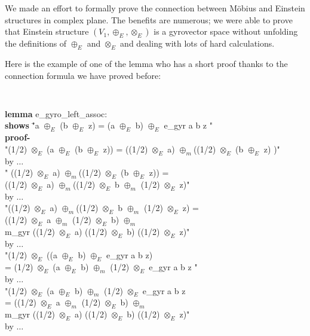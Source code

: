 \documentclass[a4paper]{article}
\newcommand{\tab}{\hspace{5mm}}
\theoremstyle{definition}
\begin{document}
We made an effort to formally prove the connection between M\" obius and Einstein structures in complex plane. The benefits are numerous; we were able to prove that Einstein structure $(V_1,\oplus_E, \otimes_E)$ is a gyrovector space without unfolding the definitions of $\oplus_E$ and $\otimes_E$ and dealing with lots of hard calculations.


Here is the example of one of the lemma who has a short proof thanks to the connection formula we have proved before:

{\tt
\begin{footnotesize}
\begin{tabbing}
{\bf lemma} e\_gyro\_left\_assoc:\\
{\bf shows} \="a $\oplus_E$ (b $\oplus_E$ z) = (a $\oplus_E$ b) $\oplus_E$ e\_gyr a b z "\\
{\bf proof-}\\
\tab {\bf have} "(1/2) $\otimes_E$ (a $\oplus_E$ (b $\oplus_E$ z)) = ((1/2) $\otimes_E$ a) $\oplus_m$((1/2) $\otimes_E$ (b $\oplus_E$ z) )" 
\\ \tab \tab by $\ldots$\\

\tab {\bf moreover have} " ((1/2) $\otimes_E$ a) $\oplus_m$((1/2) $\otimes_E$ (b $\oplus_E$ z)) = \\ \tab \tab ((1/2) $\otimes_E$ a) $\oplus_m$((1/2) $\otimes_E$ b $\oplus_m$ (1/2) $\otimes_E$ z)" 
\\ \tab \tab by $\ldots$\\

\tab {\bf moreover have} "((1/2) $\otimes_E$ a) $\oplus_m$((1/2) $\otimes_E$ b $\oplus_m$ (1/2) $\otimes_E$ z) = \\ \tab \tab ((1/2) $\otimes_E$ a $\oplus_m$ (1/2) $\otimes_E$ b) $\oplus_m$ \\ \tab \tab m\_gyr ((1/2) $\otimes_E$ a) ((1/2) $\otimes_E$ b) ((1/2) $\otimes_E$ z)" 
\\ \tab \tab by $\ldots$\\


\tab {\bf moreover have} "(1/2) $\otimes_E$ ((a $\oplus_E$ b) $\oplus_E$ e\_gyr a b z) \\ \tab \tab = (1/2)  $\otimes_E$ (a $\oplus_E$ b) $\oplus_m$ (1/2)  $\otimes_E$ e\_gyr a b z " 
\\ \tab \tab by $\ldots$\\

\tab {\bf moreover have} "(1/2)  $\otimes_E$ (a $\oplus_E$ b) $\oplus_m$ (1/2)  $\otimes_E$ e\_gyr a b z \\ \tab \tab= ((1/2)  $\otimes_E$ a  $\oplus_m$ (1/2)  $\otimes_E$ b)  $\oplus_m$  \\ \tab \tab m\_gyr ((1/2) $\otimes_E$ a) ((1/2) $\otimes_E$ b) ((1/2) $\otimes_E$ z)" 
\\ \tab \tab by $\ldots$\\


\end{tabbing}
\end{footnotesize}}
\end{document}
